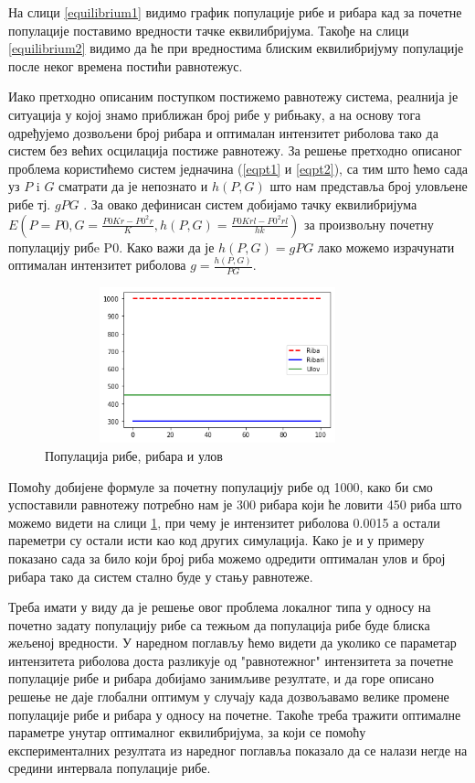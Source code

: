 \documentclass[a4paper]{article}
\begin{document}
{На слици \ref{equilibrium1} видимо график популације рибе и рибара кад за почетне популације поставимо вредности тачке еквилибријума. Такође на слици \ref{equilibrium2} видимо да ће при вредностима блиским еквилибријуму популације после неког времена постићи равнотежус.

Иако претходно описаним поступком постижемо равнотежу система, реалнија је ситуација у којој знамо приближан број рибе у рибњаку, а на основу тога одређујемо дозвољени број рибара и оптималан интензитет риболова тако да систем без већих осцилација постиже равнотежу. 
За решење претходно описаног проблема користићемо систем једначина (\ref{eqpt1} и \ref{eqpt2}), са тим што ћемо сада уз $P$ i $G$ сматрати да је непознато и $h(P,G)$ што нам представља број уловљене рибе тј. $gPG$ . За овако дефинисан систем добијамо тачку еквилибријума $E(P = P0, G = \frac{P0Kr-P0^2r}{K}, h(P,G) = \frac{P0Krl-P0^2rl}{hk})$ за произвољну почетну популацију рибe P0. Како важи да је $h(P,G) = gPG$ лако можемо израчунати оптималан интензитет риболова $g = \frac{h(P,G)}{PG}$.
    
\begin{figure}[h!]
	\centering
	\includegraphics[width=10cm,height=4.5cm]{images/optimal1.png}
	\caption{Популација рибе, рибара и улов}
	\label{optimal}
\end{figure}

Помоћу добијене формуле за почетну популацију рибе од 1000, како би смо успоставили равнотежу потребно нам је 300 рибара који ће ловити 450 риба што можемо видети на слици \ref{optimal}, при чему је интензитет риболова 0.0015 а остали пареметри су остали исти као код других симулација. Како је и у примеру показано сада за било који број риба можемо одредити оптималан улов и број рибара тако да систем стално буде у стању равнотеже.

Треба имати у виду да је решење овог проблема локалног типа у односу на почетно задату популацију рибе са тежњом да популација рибе буде блиска жељеној вредности. У наредном поглављу ћемо видети да уколико се параметар интензитета риболова доста разликује од "равнотежног" интензитета за почетне популације рибе и рибара добијамо занимљиве резултате, и да горе описано решење не даје глобални оптимум у случају када дозвољавамо велике промене популације рибе и рибара у односу на почетне. Такоће треба тражити оптималне параметре унутар оптималног еквилибријума, за који се помоћу експерименталних резултата из наредног поглавља показало да се налази негде на средини интервала популације рибе.

}
\end{document}

